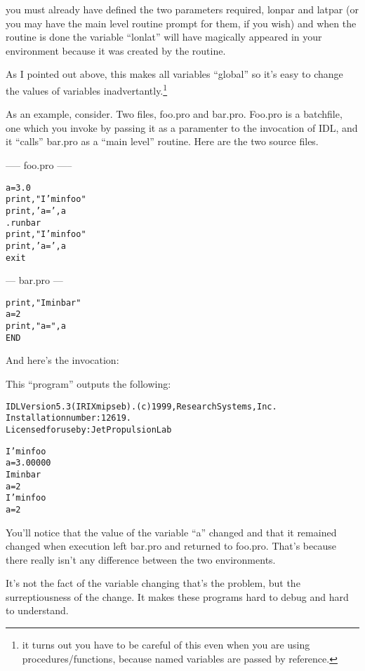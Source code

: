     you must already have defined the two parameters required, lonpar
    and latpar (or you may have the main level routine prompt for
    them, if you wish) and when the routine is done the variable
    ``lonlat'' will have magically  appeared in your environment
    because it was created by the routine.

    As I pointed out above, this makes all variables ``global'' so
    it's easy to change the values of variables
    inadvertantly.\footnote{it turns out you have to be careful of
    this even when you are using procedures/functions, because named
    variables are passed by reference.}

    As an example, consider. Two files, foo.pro and bar.pro. Foo.pro
    is a batchfile, one which you invoke by passing it as a paramenter
    to the invocation of IDL, and it  ``calls'' bar.pro as a ``main
    level'' routine. Here are the two source files.

     ----- foo.pro -----

\begin{alltt}
a = 3.0
print,"I'm in foo"
print,'a = ',a
.run bar
print,"I'm in foo"
print,'a = ',a
exit
\end{alltt}

 --- bar.pro ---


\begin{alltt}
print,"Im in bar"
a = 2
print,"a = ",a
END
\end{alltt}

    And here's the invocation:


    This ``program'' outputs the following:

\begin{alltt}
IDL Version 5.3 (IRIX mipseb). (c) 1999, Research Systems, Inc.
Installation number: 12619.
Licensed for use by: Jet Propulsion Lab

I'm in foo
a =       3.00000
% Compiled module: $MAIN$.
Im in bar
a =        2
I'm in foo
a =        2
\end{alltt}

    You'll notice that the value of the variable ``a'' changed and
    that it remained changed when execution left bar.pro and returned
    to foo.pro. That's because there really isn't any difference
    between the two environments.
    

    It's not the fact of the variable changing that's the problem, but
    the surreptiousness of the change. It makes these programs hard to
    debug and hard to understand.


